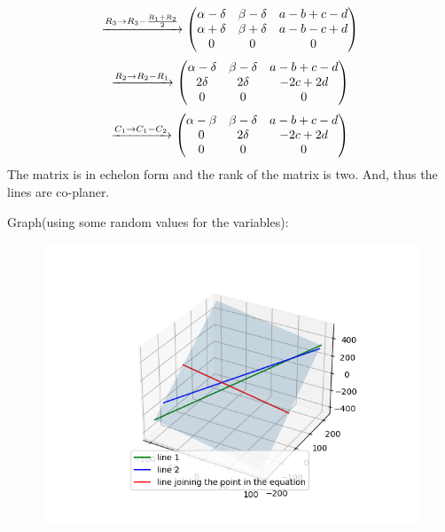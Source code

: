 \documentclass{beamer}
\numberwithin{equation}{section}
\begin{document}
		\begin{align}
				\xrightarrow[]{R_3\rightarrow R_3-\frac{R_1+R_2}{2}}\begin{pmatrix}
						\alpha - \delta & \beta -\delta & a-b+c-d \\
						\alpha + \delta & \beta +\delta & a-b-c+d\\
						0 & 0 & 0 
				\end{pmatrix}
		\end{align}
		\begin{align}
				\xrightarrow[]{R_2\rightarrow R_2-R_1}\begin{pmatrix}
						\alpha - \delta & \beta -\delta & a-b+c-d \\
						2\delta & 2\delta & -2c+2d\\
						0 & 0 & 0 
				\end{pmatrix}
		\end{align}
		\begin{align}
				\xrightarrow[]{C_1\rightarrow C_1-C_2}\begin{pmatrix}
						\alpha - \beta & \beta -\delta & a-b+c-d \\
						0 & 2\delta & -2c+2d\\
						0 & 0 & 0 
				\end{pmatrix}
		\end{align}
		The matrix is in echelon form and the rank of the matrix is two. And, thus the lines are co-planer.


Graph(using some random values for the variables):
\begin{figure}[h!]
        \centering
        \includegraphics[width=\linewidth]{img.png}
\end{figure}
\end{document}
